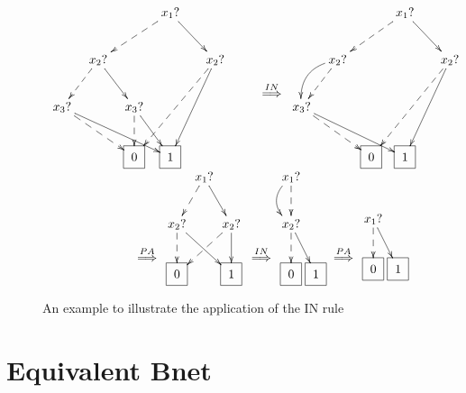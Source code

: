 \begin{figure}[h!]
$$
\begin{array}{c}
\xymatrix@C=.1pc{
&&&&&&x_1?\ar@{-->}[dllll]
\ar[drrr]
\\
&&x_2?\ar@{-->}[dll]\ar[drr]
&&&&&&&x_2?\ar@{-->}[ddlllll]\ar[ddlll]
\\
x_3?\ar[drrrrrr]\ar@{-->}[drrrr]
&&&&x_3?\ar@{-->}[d]\ar[drr]
\\
&&
&&\Rect{0}
&&\Rect{1}
&&
&&
&&
}
\xymatrix{\\\\
\stackrel{IN}{\implies}}
\xymatrix@C=.1pc{
&&&&&&x_1?\ar@{-->}[dllll]
\ar[drrr]
\\
&&x_2?\ar@{-->}[dll]\ar@/_1pc/[dll]
&&&&&&&x_2?\ar@{-->}[ddlllll]\ar[ddlll]
\\
x_3?\ar[drrrrrr]\ar@{-->}[drrrr]
&&&&
\\
&&
&&\Rect{0}
&&\Rect{1}
&&
&&
&&
}
\\
\xymatrix{\\\\\stackrel{PA}{\implies}}
\xymatrix@C=.1pc{
&x_1?\ar@{-->}[dl]\ar[dr]
\\
x_2?\ar@{-->}[d]\ar[drr]
&&x_2?\ar[d]\ar@{-->}[dll]
\\
\Rect{0}
&&\Rect{1}
}
\xymatrix{\\\\\stackrel{IN}{\implies}}
\xymatrix@C=.1pc{x_1?\ar@{-->}[d]\ar@/_1pc/[d]
\\
x_2?\ar@{-->}[d]\ar[dr]
\\
\Rect{0}
&\Rect{1}
}
\xymatrix{\\\\\stackrel{PA}{\implies}}
\xymatrix@C=.1pc{
\\
x_1?\ar@{-->}[d]\ar[dr]
\\
\Rect{0}
&\Rect{1}
}\end{array}
$$
\caption{An example 
to illustrate the application of the
IN rule}
\label{fig-example-in-rule}
\end{figure}





\section{Equivalent Bnet}

